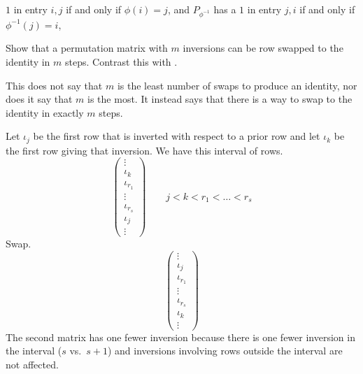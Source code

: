 \begin{exercises}
\begin{answer}
        $1$ in entry $i,j$ if and only if $\phi(i)=j$,
        and $P_{\phi^{-1}}$ has a 
        $1$ in entry $j,i$ if and only if $\phi^{-1}(j)=i$,
      \end{answer}
  \recommended \item 
    Show that a permutation matrix with \( m \) inversions can be
    row swapped to the identity in \( m \) steps.
    Contrast this with .
    \begin{answer}
      This does not say that \( m \) is the least number of swaps to produce
      an identity, nor does it say that \( m \) is the most.
      It instead says that 
      there is a way to swap to the identity in exactly \( m \) steps.

      Let \( \iota_j \) be the first row that is inverted with respect
      to a prior row
      and let \( \iota_k \) be the first row giving that inversion.
      We have this interval of rows.
      \begin{equation*}
         \begin{pmatrix}
           \vdots      \\
           \iota_k     \\
           \iota_{r_1} \\
           \vdots      \\
           \iota_{r_s} \\
           \iota_j     \\
           \vdots
         \end{pmatrix}
         \qquad j<k<r_1<\dots <r_s
      \end{equation*}
      Swap.
      \begin{equation*}
         \begin{pmatrix}
           \vdots      \\
           \iota_j     \\
           \iota_{r_1} \\
           \vdots      \\
           \iota_{r_s} \\
           \iota_k     \\
           \vdots
         \end{pmatrix}
      \end{equation*}
      The second matrix has one fewer inversion because there is one
      fewer inversion
      in the interval (\( s \) vs.\ \( s+1 \)) and inversions involving
      rows outside the interval are not affected.


\end{answer}
\end{exercises}

